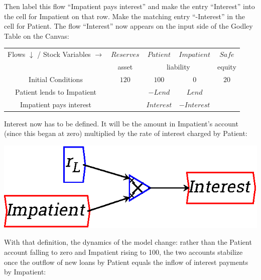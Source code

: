 Then label this flow ``Impatient pays interest'' and make the entry
``Interest'' into the cell for Impatient on that row. Make the matching
entry ``-Interest'' in the cell for Patient. The flow ``Interest'' now
appears on the input side of the Godley Table on the Canvas: 

\begin{center}
\begin{tabular}{|c|cccc|}
\hline
Flows $\downarrow$ / Stock Variables $\rightarrow$&\multicolumn{1}{|c|}{$Reserves$}&\multicolumn{1}{|c|}{$Patient$}&\multicolumn{1}{|c|}{$Impatient$}&\multicolumn{1}{|c|}{$Safe$}\\\cline{2-5}&\multicolumn{1}{|c|}{asset}&\multicolumn{2}{|c|}{liability}&\multicolumn{1}{|c|}{equity}\\\hline
Initial Conditions&$120$&$100$&$0$&$20$\\
Patient lends to Impatient&&$-Lend$&$Lend$&\\
Impatient pays interest&&$Interest$&$-Interest$&\\
\hline
\end{tabular}
\end{center}

Interest now has to be defined. It will be the amount in Impatient's
account (since this began at zero) multiplied by the rate of interest
charged by Patient:

\begin{center}
\includegraphics{images/NewItem173.eps}
\end{center}

With that definition, the dynamics of the model change: rather than
the Patient account falling to zero and Impatient rising to 100, the
two accounts stabilize once the outflow of new loans by Patient equals
the inflow of interest payments by Impatient:

